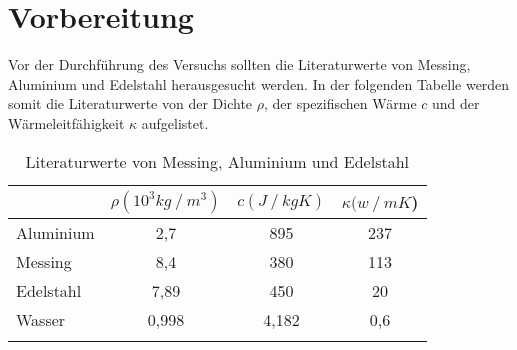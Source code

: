 \section{Vorbereitung}
\label{sec:Vorbereitung}

Vor der Durchführung des Versuchs sollten die Literaturwerte von Messing, Aluminium und Edelstahl herausgesucht werden.
In der folgenden Tabelle werden somit die Literaturwerte von der Dichte $\rho$, der spezifischen Wärme $c$ und der Wärmeleitfähigkeit $\kappa$ aufgelistet.

\begin{table}
    \centering
    \caption{Literaturwerte von Messing, Aluminium und Edelstahl}
    \label{fig:Vorbereitung} 
    \begin{tabular}{
        l
        c
        c
        c
        }
    \toprule
    & {$\rho (10^3\si{kg}\mathbin{/}\si{m^3})$} &{$c (\si{J}\mathbin{/}\si{kg}\si{K})$} & {$\kappa (\si{w}\mathbin{/}\si{mK}$)} \\
    \midrule
        Aluminium & 2,7 & 895 & 237 \\
        Messing & 8,4 & 380 & 113 \\
        Edelstahl & 7,89 & 450 & 20\\
        Wasser & 0,998 & 4,182 & 0,6 \\
    \bottomrule
    \cite[378,381]{PhyPrak} \cite{EdelWäLeit} 
    \end{tabular}
\end{table}